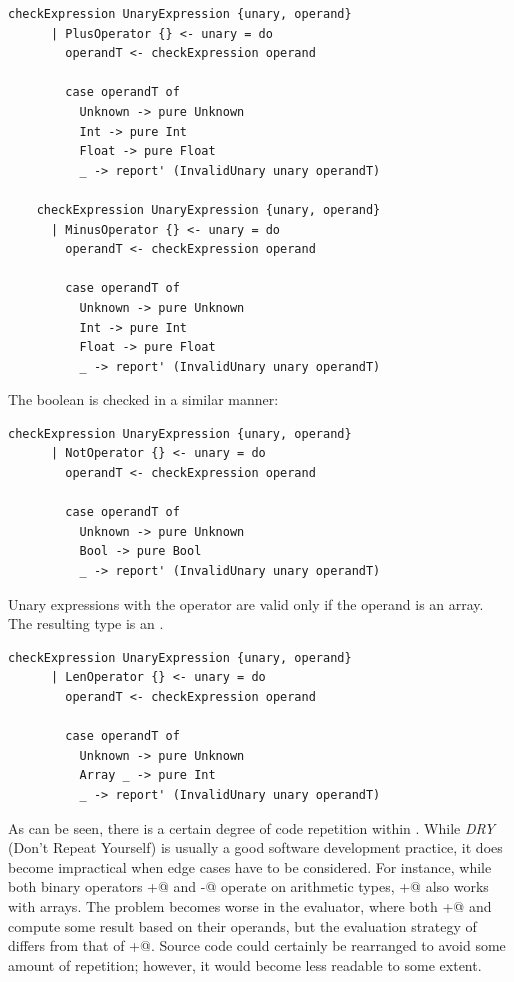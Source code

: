 \documentclass[UdineBachThesis,american,11pt]{PhdThesis}
\begin{document}
  \begin{lstlisting}[gobble=4,basicstyle=\ttfamily\small]
    checkExpression UnaryExpression {unary, operand}
      | PlusOperator {} <- unary = do
        operandT <- checkExpression operand

        case operandT of
          Unknown -> pure Unknown
          Int -> pure Int
          Float -> pure Float
          _ -> report' (InvalidUnary unary operandT)

    checkExpression UnaryExpression {unary, operand}
      | MinusOperator {} <- unary = do
        operandT <- checkExpression operand

        case operandT of
          Unknown -> pure Unknown
          Int -> pure Int
          Float -> pure Float
          _ -> report' (InvalidUnary unary operandT)
  \end{lstlisting}

  The boolean \lstinline@not@ is checked in a similar manner:

  \begin{lstlisting}[gobble=4,basicstyle=\ttfamily\small]
    checkExpression UnaryExpression {unary, operand}
      | NotOperator {} <- unary = do
        operandT <- checkExpression operand

        case operandT of
          Unknown -> pure Unknown
          Bool -> pure Bool
          _ -> report' (InvalidUnary unary operandT)
  \end{lstlisting}

  Unary expressions with the operator \lstinline@len@ are valid only if the
  operand is an array. The resulting type is an \lstinline@Int@.

  \begin{lstlisting}[gobble=4,basicstyle=\ttfamily\small]
    checkExpression UnaryExpression {unary, operand}
      | LenOperator {} <- unary = do
        operandT <- checkExpression operand

        case operandT of
          Unknown -> pure Unknown
          Array _ -> pure Int
          _ -> report' (InvalidUnary unary operandT)
  \end{lstlisting}

  As can be seen, there is a certain degree of code repetition within
  \lstinline@checkExpression@. While \emph{DRY} (Don't Repeat Yourself) is
  usually a good software development practice, it does become impractical when
  edge cases have to be considered. For instance, while both binary operators
  \lstinline@+@ and \lstinline@-@ operate on arithmetic types, \lstinline@+@
  also works with arrays. The problem becomes worse in the evaluator, where both
  \lstinline@+@ and \lstinline@and@ compute some result based on their operands,
  but the evaluation strategy of \lstinline@and@ differs from that of
  \lstinline@+@. Source code could certainly be rearranged to avoid some amount
  of repetition; however, it would become less readable to some extent.
\end{document}
